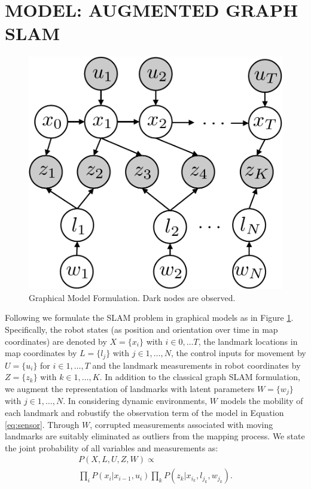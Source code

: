 \section{MODEL: AUGMENTED GRAPH SLAM}
\label{sec:model}
\begin{figure}[!t]
\begin{center}
 \includegraphics[width=0.5\columnwidth]{fig/model} 
\end{center}
\caption{Graphical Model Formulation. Dark nodes are observed.}
\label{fig:model}
\end{figure}

Following \cite{isam} we formulate the SLAM problem in graphical models as in Figure \ref{fig:model}. Specifically, the robot states (as position and orientation over time in map coordinates) are denoted by $X = \{x_i\}$ with $i \in 0, \dots T$, the landmark locations in map coordinates by $L = \{l_j\}$ with $j \in 1,\dots, N$, the control inputs for movement by $U = \{u_i\}$ for $i \in 1,\dots, T$ and the landmark measurements in robot coordinates by $Z = \{z_k\}$ with $k \in 1, \dots, K$. In addition to the classical graph SLAM formulation, we augment the representation of landmarks with latent parameters $W = \{w_j\}$ with $j \in 1, \dots, N$.
In considering dynamic environments, $W$ models the mobility of each landmark and robustify the observation term of the model in Equation \ref{eq:sensor}.  Through $W$, corrupted measurements associated with moving landmarks are suitably eliminated as outliers from the mapping process. We state the joint probability of all variables and measurements as:
\begin{multline}
P(X, L, U, Z, W) \propto  \\
\prod\limits_{i}P(x_i|x_{i-1}, u_i)\prod\limits_{k}P(z_k|x_{i_k}, l_{j_k}, w_{j_k}).
\label{eq:jointProb}
\end{multline}

